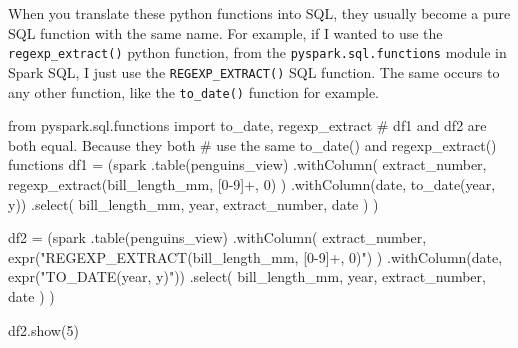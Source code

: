 \documentclass[
  11pt,
  letterpaper,
  DIV=11,
  numbers=noendperiod]{scrreprt}
\newenvironment{Shaded}{\begin{snugshade}}{\end{snugshade}}
\newcommand{\CommentTok}[1]{\textcolor[rgb]{0.37,0.37,0.37}{#1}}
\newcommand{\DecValTok}[1]{\textcolor[rgb]{0.68,0.00,0.00}{#1}}
\newcommand{\ImportTok}[1]{\textcolor[rgb]{0.00,0.46,0.62}{#1}}
\newcommand{\NormalTok}[1]{\textcolor[rgb]{0.00,0.23,0.31}{#1}}
\newcommand{\OperatorTok}[1]{\textcolor[rgb]{0.37,0.37,0.37}{#1}}
\newcommand{\StringTok}[1]{\textcolor[rgb]{0.13,0.47,0.30}{#1}}
\begin{document}
When you translate these python functions into SQL, they usually become
a pure SQL function with the same name. For example, if I wanted to use
the \texttt{regexp\_extract()} python function, from the
\texttt{pyspark.sql.functions} module in Spark SQL, I just use the
\texttt{REGEXP\_EXTRACT()} SQL function. The same occurs to any other
function, like the \texttt{to\_date()} function for example.

\begin{Shaded}
\begin{Highlighting}[]
\ImportTok{from}\NormalTok{ pyspark.sql.functions }\ImportTok{import}\NormalTok{ to\_date, regexp\_extract}
\CommentTok{\# \textasciigrave{}df1\textasciigrave{} and \textasciigrave{}df2\textasciigrave{} are both equal. Because they both}
\CommentTok{\# use the same \textasciigrave{}to\_date()\textasciigrave{} and \textasciigrave{}regexp\_extract()\textasciigrave{} functions}
\NormalTok{df1 }\OperatorTok{=}\NormalTok{ (spark}
\NormalTok{  .table(}\StringTok{\textquotesingle{}penguins\_view\textquotesingle{}}\NormalTok{)}
\NormalTok{  .withColumn(}
    \StringTok{\textquotesingle{}extract\_number\textquotesingle{}}\NormalTok{,}
\NormalTok{    regexp\_extract(}\StringTok{\textquotesingle{}bill\_length\_mm\textquotesingle{}}\NormalTok{, }\StringTok{\textquotesingle{}[0{-}9]+\textquotesingle{}}\NormalTok{, }\DecValTok{0}\NormalTok{)}
\NormalTok{  )}
\NormalTok{  .withColumn(}\StringTok{\textquotesingle{}date\textquotesingle{}}\NormalTok{, to\_date(}\StringTok{\textquotesingle{}year\textquotesingle{}}\NormalTok{, }\StringTok{\textquotesingle{}y\textquotesingle{}}\NormalTok{))}
\NormalTok{  .select(}
    \StringTok{\textquotesingle{}bill\_length\_mm\textquotesingle{}}\NormalTok{, }\StringTok{\textquotesingle{}year\textquotesingle{}}\NormalTok{,}
    \StringTok{\textquotesingle{}extract\_number\textquotesingle{}}\NormalTok{, }\StringTok{\textquotesingle{}date\textquotesingle{}}
\NormalTok{  )}
\NormalTok{)}

\NormalTok{df2 }\OperatorTok{=}\NormalTok{ (spark}
\NormalTok{  .table(}\StringTok{\textquotesingle{}penguins\_view\textquotesingle{}}\NormalTok{)}
\NormalTok{  .withColumn(}
    \StringTok{\textquotesingle{}extract\_number\textquotesingle{}}\NormalTok{,}
\NormalTok{    expr(}\StringTok{"REGEXP\_EXTRACT(bill\_length\_mm, \textquotesingle{}[0{-}9]+\textquotesingle{}, 0)"}\NormalTok{)}
\NormalTok{  )}
\NormalTok{  .withColumn(}\StringTok{\textquotesingle{}date\textquotesingle{}}\NormalTok{, expr(}\StringTok{"TO\_DATE(year, \textquotesingle{}y\textquotesingle{})"}\NormalTok{))}
\NormalTok{  .select(}
    \StringTok{\textquotesingle{}bill\_length\_mm\textquotesingle{}}\NormalTok{, }\StringTok{\textquotesingle{}year\textquotesingle{}}\NormalTok{,}
    \StringTok{\textquotesingle{}extract\_number\textquotesingle{}}\NormalTok{, }\StringTok{\textquotesingle{}date\textquotesingle{}}
\NormalTok{  )}
\NormalTok{)}

\NormalTok{df2.show(}\DecValTok{5}\NormalTok{)}
\end{Highlighting}
\end{Shaded}
\end{document}
